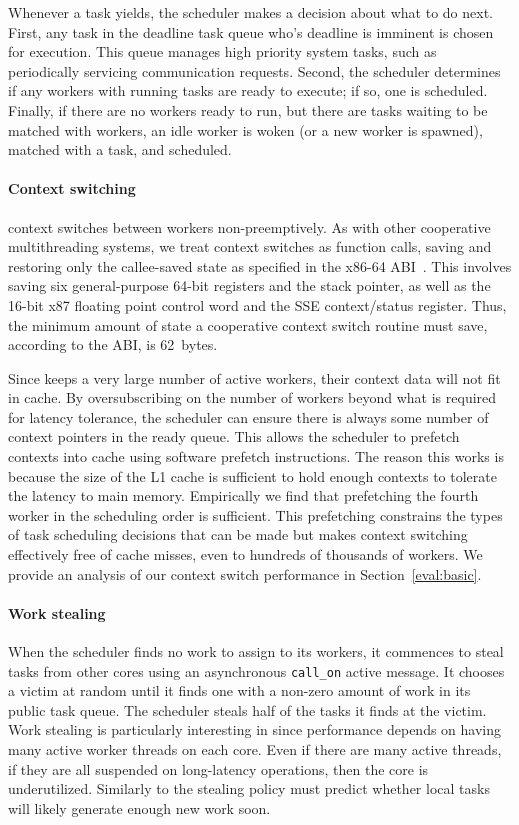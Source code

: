 Whenever a task yields, the scheduler makes a decision about what
to do next. First, any task in the deadline task queue who's deadline
is imminent is chosen for execution. This queue manages high priority
system tasks, such as periodically servicing communication requests. Second,
the scheduler determines if any workers with running tasks are ready to
execute; if so, one is scheduled. Finally, if there are no workers ready to
run, but there are tasks waiting to be matched with workers, an idle worker is
woken (or a new worker is spawned), matched with a task, and scheduled.

\paragraph{Context switching} 
\Grappa context switches between workers non-preemptively. As with other
cooperative multithreading systems, we treat context switches as function
calls, saving and restoring only the callee-saved state as specified in the
x86-64 ABI~\cite{amd64:abi:2012}. This involves saving six general-purpose
64-bit registers and the stack pointer, as well as the 16-bit x87 floating
point control word and the SSE context/status register. Thus, the minimum
amount of state a cooperative context switch routine must save, according to
the ABI, is 62~bytes.

Since \Grappa keeps a very large number of active workers, their context data
will not fit in cache. By oversubscribing on the number of workers
beyond what is required for latency tolerance, the scheduler can
ensure there is always some number of context pointers in the ready
queue. This allows the scheduler to prefetch contexts into
cache using software prefetch instructions. The reason this works is because the size of the L1 cache is
sufficient to hold enough contexts to tolerate the latency to main
memory. Empirically we find that prefetching the fourth worker in the scheduling order is
sufficient. This prefetching constrains the types of task scheduling
decisions that can be made but makes context switching effectively
free of cache misses, even to hundreds
of thousands of workers. We provide an analysis of our context switch
performance in Section~\ref{eval:basic}.


\paragraph{Work stealing} 
When the scheduler finds no work to assign to its workers, it commences to
steal tasks from other cores using an asynchronous \texttt{call\_on} active
message. It chooses a victim at random until it finds one with a non-zero
amount of work in its public task queue. The scheduler steals half of the
tasks it finds at the victim. Work stealing is particularly interesting in
\Grappa since performance depends on having many active worker threads on each
core. Even if there are many active threads, if they are all suspended on
long-latency operations, then the core is underutilized. Similarly to
\cite{the_hierarchical_workstealing} the
stealing policy must predict whether local tasks will likely
generate enough new work soon.

